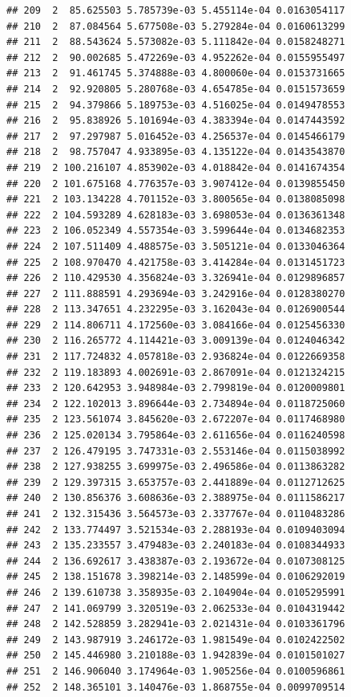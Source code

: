 \documentclass[article]{jss}\usepackage[]{graphicx}\usepackage[]{xcolor}
\makeatletter
\newenvironment{kframe}{%
 \def\at@end@of@kframe{}%
 \ifinner\ifhmode%
  \def\at@end@of@kframe{\end{minipage}}%
  \begin{minipage}{\columnwidth}%
 \fi\fi%
 \def\FrameCommand##1{\hskip\@totalleftmargin \hskip-\fboxsep
 \colorbox{shadecolor}{##1}\hskip-\fboxsep
     \hskip-\linewidth \hskip-\@totalleftmargin \hskip\columnwidth}%
 \MakeFramed {\advance\hsize-\width
   \@totalleftmargin\z@ \linewidth\hsize
   \@setminipage}}%
 {\par\unskip\endMakeFramed%
 \at@end@of@kframe}
\newenvironment{knitrout}{}{} %
\makeatother
\begin{document}
\begin{knitrout}
\begin{kframe}
\begin{verbatim}
## 209  2  85.625503 5.785739e-03 5.455114e-04 0.0163054117
## 210  2  87.084564 5.677508e-03 5.279284e-04 0.0160613299
## 211  2  88.543624 5.573082e-03 5.111842e-04 0.0158248271
## 212  2  90.002685 5.472269e-03 4.952262e-04 0.0155955497
## 213  2  91.461745 5.374888e-03 4.800060e-04 0.0153731665
## 214  2  92.920805 5.280768e-03 4.654785e-04 0.0151573659
## 215  2  94.379866 5.189753e-03 4.516025e-04 0.0149478553
## 216  2  95.838926 5.101694e-03 4.383394e-04 0.0147443592
## 217  2  97.297987 5.016452e-03 4.256537e-04 0.0145466179
## 218  2  98.757047 4.933895e-03 4.135122e-04 0.0143543870
## 219  2 100.216107 4.853902e-03 4.018842e-04 0.0141674354
## 220  2 101.675168 4.776357e-03 3.907412e-04 0.0139855450
## 221  2 103.134228 4.701152e-03 3.800565e-04 0.0138085098
## 222  2 104.593289 4.628183e-03 3.698053e-04 0.0136361348
## 223  2 106.052349 4.557354e-03 3.599644e-04 0.0134682353
## 224  2 107.511409 4.488575e-03 3.505121e-04 0.0133046364
## 225  2 108.970470 4.421758e-03 3.414284e-04 0.0131451723
## 226  2 110.429530 4.356824e-03 3.326941e-04 0.0129896857
## 227  2 111.888591 4.293694e-03 3.242916e-04 0.0128380270
## 228  2 113.347651 4.232295e-03 3.162043e-04 0.0126900544
## 229  2 114.806711 4.172560e-03 3.084166e-04 0.0125456330
## 230  2 116.265772 4.114421e-03 3.009139e-04 0.0124046342
## 231  2 117.724832 4.057818e-03 2.936824e-04 0.0122669358
## 232  2 119.183893 4.002691e-03 2.867091e-04 0.0121324215
## 233  2 120.642953 3.948984e-03 2.799819e-04 0.0120009801
## 234  2 122.102013 3.896644e-03 2.734894e-04 0.0118725060
## 235  2 123.561074 3.845620e-03 2.672207e-04 0.0117468980
## 236  2 125.020134 3.795864e-03 2.611656e-04 0.0116240598
## 237  2 126.479195 3.747331e-03 2.553146e-04 0.0115038992
## 238  2 127.938255 3.699975e-03 2.496586e-04 0.0113863282
## 239  2 129.397315 3.653757e-03 2.441889e-04 0.0112712625
## 240  2 130.856376 3.608636e-03 2.388975e-04 0.0111586217
## 241  2 132.315436 3.564573e-03 2.337767e-04 0.0110483286
## 242  2 133.774497 3.521534e-03 2.288193e-04 0.0109403094
## 243  2 135.233557 3.479483e-03 2.240183e-04 0.0108344933
## 244  2 136.692617 3.438387e-03 2.193672e-04 0.0107308125
## 245  2 138.151678 3.398214e-03 2.148599e-04 0.0106292019
## 246  2 139.610738 3.358935e-03 2.104904e-04 0.0105295991
## 247  2 141.069799 3.320519e-03 2.062533e-04 0.0104319442
## 248  2 142.528859 3.282941e-03 2.021431e-04 0.0103361796
## 249  2 143.987919 3.246172e-03 1.981549e-04 0.0102422502
## 250  2 145.446980 3.210188e-03 1.942839e-04 0.0101501027
## 251  2 146.906040 3.174964e-03 1.905256e-04 0.0100596861
## 252  2 148.365101 3.140476e-03 1.868755e-04 0.0099709514

\end{verbatim}
\end{kframe}
\end{knitrout}
\end{document}
